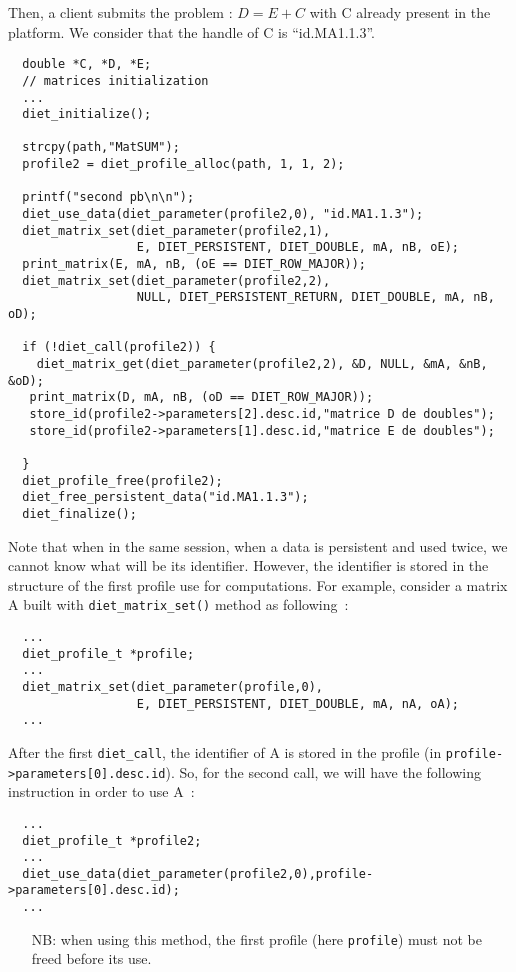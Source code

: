 Then, a client submits the problem : $D=E+C$ with C already present in the platform.
We consider that the handle of C is ``id.MA1.1.3''.

{\footnotesize
\begin{verbatim}
  double *C, *D, *E; 
  // matrices initialization
  ...
  diet_initialize();

  strcpy(path,"MatSUM");
  profile2 = diet_profile_alloc(path, 1, 1, 2);
  
  printf("second pb\n\n");
  diet_use_data(diet_parameter(profile2,0), "id.MA1.1.3");
  diet_matrix_set(diet_parameter(profile2,1),
                  E, DIET_PERSISTENT, DIET_DOUBLE, mA, nB, oE);
  print_matrix(E, mA, nB, (oE == DIET_ROW_MAJOR));
  diet_matrix_set(diet_parameter(profile2,2),
                  NULL, DIET_PERSISTENT_RETURN, DIET_DOUBLE, mA, nB, oD);
  
  if (!diet_call(profile2)) {
    diet_matrix_get(diet_parameter(profile2,2), &D, NULL, &mA, &nB, &oD);
   print_matrix(D, mA, nB, (oD == DIET_ROW_MAJOR));
   store_id(profile2->parameters[2].desc.id,"matrice D de doubles");
   store_id(profile2->parameters[1].desc.id,"matrice E de doubles");
  
  }
  diet_profile_free(profile2);
  diet_free_persistent_data("id.MA1.1.3");
  diet_finalize();
\end{verbatim}
}  

Note that when in the same session, when a data is persistent and used
twice, we cannot know what will be its identifier. However, the
identifier is stored in the structure of the first profile use for
computations. For example, consider a matrix A built with
\texttt{diet\_matrix\_set()} method as following~: {\footnotesize
\begin{verbatim}
  ...
  diet_profile_t *profile;
  ...
  diet_matrix_set(diet_parameter(profile,0),
                  E, DIET_PERSISTENT, DIET_DOUBLE, mA, nA, oA);
  ...
\end{verbatim}
} After the first \texttt{diet\_call}, the identifier of A is stored in
the profile (in \texttt{profile->parameters[0].desc.id}). So, for the
second call, we will have the following instruction in order to use A~:
{\footnotesize
\begin{verbatim}
  ...
  diet_profile_t *profile2;
  ...
  diet_use_data(diet_parameter(profile2,0),profile->parameters[0].desc.id);
  ...
\end{verbatim}
}

\begin{itemize}
\item[NB:] when using this method, the first profile (here
\texttt{profile}) must not be freed before its use. 
\end{itemize}
